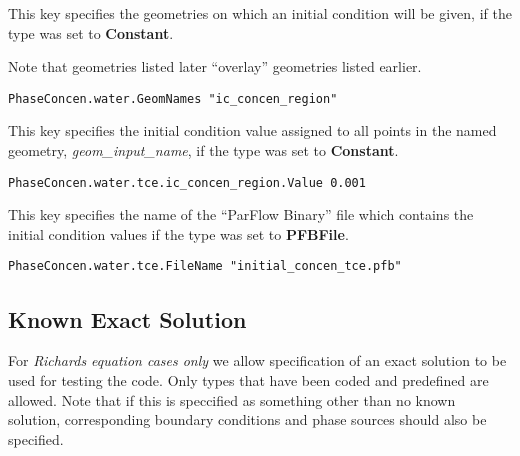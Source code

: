 {
This key specifies the geometries on which an initial condition will be
given, if the type was set to {\bf Constant}.

Note that geometries listed later ``overlay'' geometries listed earlier.
}
\begin{display}\begin{verbatim}
PhaseConcen.water.GeomNames "ic_concen_region"
\end{verbatim}\end{display}

{
This key specifies the initial condition value assigned to all points in
the named geometry, {\em geom\_input\_name}, if the type was set to
{\bf Constant}.
}
\begin{display}\begin{verbatim}
PhaseConcen.water.tce.ic_concen_region.Value 0.001
\end{verbatim}\end{display}

{
This key specifies the name of the ``ParFlow Binary'' file which
contains the initial condition values if the type was set to {\bf PFBFile}.
}
\begin{display}\begin{verbatim}
PhaseConcen.water.tce.FileName "initial_concen_tce.pfb"
\end{verbatim}\end{display}


\subsection{Known Exact Solution}
\label{ExactSolution}

For {\em Richards equation cases only} we allow specification of an exact
solution to be used for testing the code.
Only types that have been coded and predefined are allowed.
Note that if this is speccified as something other than no known solution,
corresponding boundary conditions and phase sources should also be specified.

